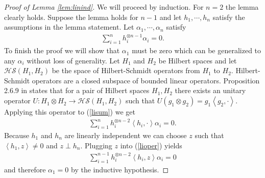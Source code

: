 \documentclass{article} %
\def\l{\left}
\def\r{\right}
\def\hs{\mathscr{HS}}
\theoremstyle{definition}
\begin{document}
\begin{proof}[Proof of Lemma \ref{lem:linind}]
	We will proceed by induction. For $n=2$ the lemma clearly holds. Suppose the lemma holds for $n-1$ and let $h_1,\cdots, h_n$ satisfy the assumptions in the lemma statement. Let $\alpha_1,\cdots, \alpha_n$ satisfy
\begin{eqnarray}
	\sum_{i=1}^n h_i^{\otimes n-1} \alpha_i = 0. \label{lisum}
\end{eqnarray}
To finish the proof we will show that $\alpha_1$ must be zero which can be generalized to any $\alpha_i$ without loss of generality.
Let $H_1$ and $H_2$ be Hilbert spaces and let $\hs\left( H_1, H_2 \right)$ be the space of Hilbert-Schmidt operators from $H_1$ to $H_2$. Hilbert-Schmidt operators are a closed subspace of bounded linear operators. Proposition 2.6.9 in \cite{kadison83} states that for a pair of Hilbert spaces $H_1, H_2$ there exists an unitary operator $U:H_1 \otimes H_2 \to \hs\left( H_1,H_2 \right)$ such that $U(g_1\otimes g_2) = g_1 \l<g_2, \cdot\r>$. Applying this operator to (\ref{lisum}) we get
\begin{eqnarray}
	\sum_{i=1}^n h_i^{\otimes n-2}\l<h_i, \cdot \r> \alpha_i = 0. \label{lioper}
\end{eqnarray}
Because $h_1$ and $h_n$ are linearly independent we can choose $z$ such that $\l<h_1,z\r> \neq 0$ and $z\perp h_n$. Plugging $z$ into (\ref{lioper}) yields
\begin{eqnarray*}
	\sum_{i=1}^{n-1} h_i^{\otimes n-2}\l<h_i, z \r> \alpha_i = 0 
\end{eqnarray*}
and therefore $\alpha_1=0$ by the inductive hypothesis.
\end{proof}
\end{document}
